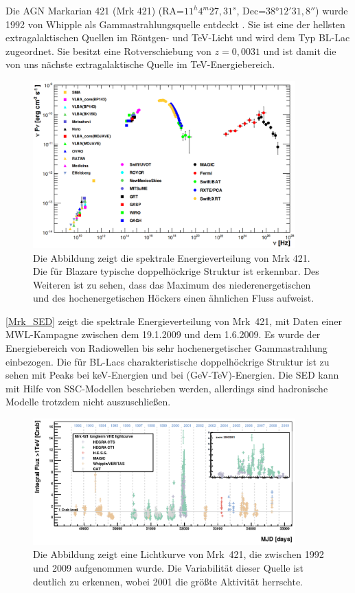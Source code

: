 Die AGN Markarian 421 (Mrk 421) (RA=$11^h 4^m 27,31^s$, Dec=$38°12' 31,8''$) wurde 1992 von Whipple als Gammastrahlungsquelle entdeckt \cite{EntdeckungWhipple}.
Sie ist eine der hellsten extragalaktischen Quellen im Röntgen- und TeV-Licht und wird dem Typ BL-Lac zugeordnet.
Sie besitzt eine Rotverschiebung von $z=0,0031$ und ist damit die von uns nächste extragalaktische Quelle im TeV-Energiebereich.\cite{MWL2009}

\begin{figure}
    \centering
    \includegraphics[width=0.9\textwidth]{./Plots/02_Astroteilchenphysik/SED_Mrk421.png}
    \caption{Die Abbildung zeigt die spektrale Energieverteilung von Mrk 421. Die für Blazare typische doppelhöckrige Struktur ist erkennbar. 
     Des Weiteren ist zu sehen, dass das Maximum des niederenergetischen und des hochenergetischen Höckers einen ähnlichen Fluss aufweist.\cite{Mrk421_SED}}
    \label{Mrk_SED}
\end{figure}

\autoref{Mrk_SED} zeigt die spektrale Energieverteilung von Mrk~421, mit Daten einer MWL-Kampagne zwischen dem 19.1.2009 und dem 1.6.2009. 
Es wurde der Energiebereich von Radiowellen bis sehr hochenergetischer Gammastrahlung einbezogen.
Die für BL-Lacs charakteristische doppelhöckrige Struktur ist zu sehen mit Peaks bei keV-Energien und bei (GeV-TeV)-Energien.
Die SED kann mit Hilfe von SSC-Modellen beschrieben werden, allerdings sind hadronische Modelle trotzdem nicht auszuschließen.

\begin{figure}
    \centering
    \includegraphics[width=0.9\textwidth]{./Plots/02_Astroteilchenphysik/Mrk421_LC_lang.png}
    \caption{Die Abbildung zeigt eine Lichtkurve von Mrk~421, die zwischen 1992 und 2009 aufgenommen wurde.
    Die Variabilität dieser Quelle ist deutlich zu erkennen, wobei 2001 die größte Aktivität herrschte.\cite{Mrk421_LC_lang}}
    \label{Mrk421_LC_Alles}
\end{figure}

